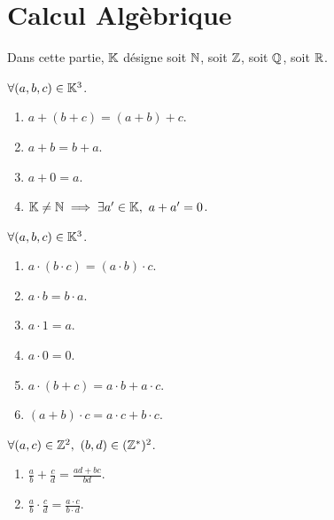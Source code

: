\chapter{Calcul Algèbrique}
\par \noindent Dans cette partie, $\mathbb{K}$ désigne soit $\mathbb{N}$, soit $\mathbb{Z}$, soit $\mathbb{Q}$, soit $\mathbb{R}$.

\begin{axiom}
    $\forall (a, b, c) \in \mathbb{K}^3$.
    \begin{enumerate}
    	\item $a + (b + c) = (a + b) + c$.
    	\item $a + b = b + a$.
    	\item $a + 0 = a$.
    	\item $\mathbb{K} \neq \mathbb{N} \implies \exists a' \in \mathbb{K},\ a + a' = 0$.
    \end{enumerate}
\end{axiom}

\begin{axiom}
    $\forall (a, b, c) \in \mathbb{K}^3$. 
    \begin{enumerate}
    	\item $a \cdot (b \cdot c) = (a \cdot b) \cdot c$.
    	\item $a \cdot b = b \cdot a$.
    	\item $a \cdot 1 = a$.
    	\item $a \cdot 0 = 0$.
    	\item $a \cdot (b + c) = a \cdot b + a \cdot c$.
    	\item $(a + b) \cdot c = a \cdot c + b \cdot c$.
    \end{enumerate}
\end{axiom}

\begin{proposition}
    $\forall (a, c) \in \mathbb{Z}^2,\ (b, d) \in (\mathbb{Z}^*)^2$.
    \begin{multicols}{2}
    	\begin{enumerate}
    		\item $\frac{a}{b} + \frac{c}{d} = \frac{ad + bc}{bd}$.
    		\item $\frac{a}{b} \cdot \frac{c}{d} = \frac{a \cdot c}{b \cdot d}$.
    	\end{enumerate}
    \end{multicols}
\end{proposition}

